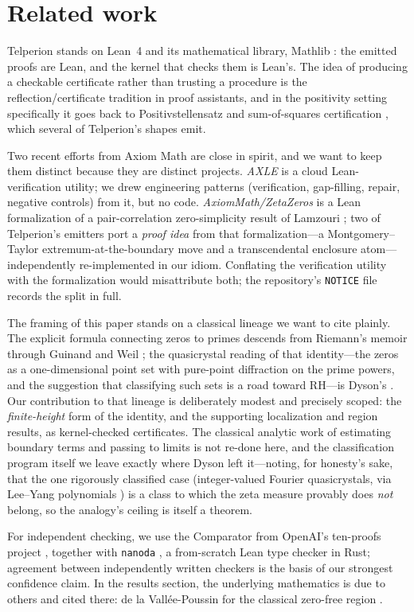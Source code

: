 \section{Related work}
\label{sec:related}

Telperion stands on Lean~4 and its mathematical library, Mathlib
\cite{lean4,mathlib}: the emitted proofs are Lean, and the kernel that checks them
is Lean's. The idea of producing a checkable certificate rather than trusting a
procedure is the reflection/certificate tradition in proof assistants, and in the
positivity setting specifically it goes back to Positivstellensatz and
sum-of-squares certification \cite{positivstellensatz,lasserre_sos}, which several
of Telperion's shapes emit.

Two recent efforts from Axiom Math are close in spirit, and we want to keep them
distinct because they are distinct projects. \emph{AXLE} \cite{axle} is a cloud
Lean-verification utility; we drew engineering patterns (verification, gap-filling,
repair, negative controls) from it, but no code. \emph{AxiomMath/ZetaZeros}
is a Lean formalization of a pair-correlation zero-simplicity result of Lamzouri
\cite{axiommath_zetazeros}; two of Telperion's emitters port a \emph{proof idea}
from that formalization---a Montgomery--Taylor extremum-at-the-boundary move and a
transcendental enclosure atom---independently re-implemented in our idiom. Conflating the
verification utility with the formalization would misattribute both; the
repository's \texttt{NOTICE} file records the split in full.

The framing of this paper stands on a classical lineage we want to cite
plainly. The explicit formula connecting zeros to primes descends from
Riemann's memoir through Guinand \cite{guinand1948} and Weil \cite{weil1952};
the quasicrystal reading of that identity---the zeros as a one-dimensional
point set with pure-point diffraction on the prime powers, and the suggestion
that classifying such sets is a road toward RH---is Dyson's \cite{dyson2009}.
Our contribution to that lineage is deliberately modest and precisely scoped:
the \emph{finite-height} form of the identity, and the supporting localization
and region results, as kernel-checked certificates. The classical analytic work
of estimating boundary terms and passing to limits is not re-done here, and the
classification program itself we leave exactly where Dyson left it---noting, for
honesty's sake, that the one rigorously classified case (integer-valued Fourier
quasicrystals, via Lee--Yang polynomials \cite{kurasovsarnak2020}) is a class to
which the zeta measure provably does \emph{not} belong, so the analogy's ceiling
is itself a theorem.

For independent checking, we use the Comparator \cite{comparator} from OpenAI's
ten-proofs project \cite{tenproofs}, together with \texttt{nanoda} \cite{nanoda},
a from-scratch Lean type checker in Rust; agreement between independently written
checkers is the basis of our strongest confidence claim. In the results section, the
underlying mathematics is due to others and cited there: de la Vallée-Poussin for
the classical zero-free region \cite{dlvp1896}.
